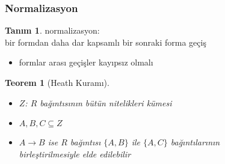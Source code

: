 \documentclass[dvipsnames]{beamer}
\theoremstyle{definition}
\newtheorem{tanim}[theorem]{Tanım}
\theoremstyle{example}
\theoremstyle{plain}
\newtheorem{teorem}[theorem]{Teorem}
\begin{document}
\begin{frame}
  \frametitle{Normalizasyon}

  \begin{tanim}
    \alert{normalizasyon}:\\
      bir formdan daha dar kapsamlı bir sonraki forma geçiş

    \begin{itemize}
      \item formlar arası geçişler kayıpsız olmalı
    \end{itemize}
  \end{tanim}

  \pause
  \begin{teorem}[Heath Kuramı]
    \begin{itemize}
      \item $Z$: $R$ bağıntısının bütün nitelikleri kümesi
      \item $A,B,C \subseteq Z$

      \pause
      \item $A \rightarrow B$ ise $R$ bağıntısı $\{A,B\}$ ile $\{A,C\}$
        bağıntılarının\\
        birleştirilmesiyle elde edilebilir
    \end{itemize}
  \end{teorem}
\end{frame}
\end{document}
